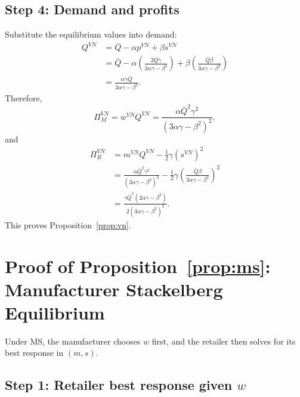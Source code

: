 \subsection{Step 4: Demand and profits}

Substitute the equilibrium values into demand:
\begin{align}
 Q^{VN}
 &= \bar Q-\alpha p^{VN}+\beta s^{VN} \\
 &= \bar Q-\alpha\left(\frac{2\bar Q\gamma}{3\alpha\gamma-\beta^2}\right)
 +\beta\left(\frac{\bar Q\beta}{3\alpha\gamma-\beta^2}\right) \\
 &= \frac{\alpha\gamma\bar Q}{3\alpha\gamma-\beta^2}.
\end{align}
Therefore,
\begin{equation}
 \Pi_M^{VN}=w^{VN}Q^{VN}
 =\frac{\alpha\bar Q^2\gamma^2}{(3\alpha\gamma-\beta^2)^2},
\end{equation}
and
\begin{align}
 \Pi_R^{VN}
 &=m^{VN}Q^{VN}-\frac{1}{2}\gamma(s^{VN})^2 \\
 &=\frac{\alpha\bar Q^2\gamma^2}{(3\alpha\gamma-\beta^2)^2}
 -\frac{1}{2}\gamma\left(\frac{\bar Q\beta}{3\alpha\gamma-\beta^2}\right)^2 \\
 &=\frac{\gamma\bar Q^2(2\alpha\gamma-\beta^2)}{2(3\alpha\gamma-\beta^2)^2}.
\end{align}
This proves Proposition~\ref{prop:vn}.

\section{Proof of Proposition~\ref{prop:ms}: Manufacturer Stackelberg Equilibrium}
\label{app:proof_ms}

Under MS, the manufacturer chooses $w$ first, and the retailer then solves for
its best response in $(m,s)$.

\subsection{Step 1: Retailer best response given $w$}


